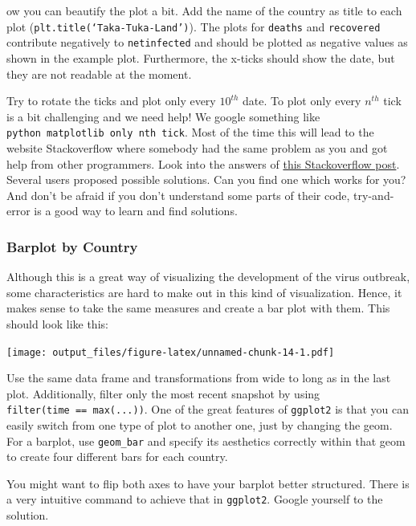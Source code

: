 \documentclass[
  11pt,
]{article}
\newenvironment{tips}[1]
  {
  \begin{itemize}
  \footnotesize
  \renewcommand{\labelitemi}{
    \raisebox{-.7\height}[0pt][0pt]{
      {\setkeys{Gin}{width=3em,keepaspectratio}
        \texttt{[image: images/\#1.png]}}
    }
  }
  \setlength{\fboxsep}{1em}
  \begin{rbox}
  \item
  }
  {
  \end{rbox}
  \end{itemize}
  }
\newenvironment{tipsp}[1]
  {
  \begin{itemize}
  \footnotesize
  \renewcommand{\labelitemi}{
    \raisebox{-.7\height}[0pt][0pt]{
      {\setkeys{Gin}{width=3em,keepaspectratio}
        \texttt{[image: images/\#1.png]}}
    }
  }
  \setlength{\fboxsep}{1em}
  \begin{pbox}
  \item
  }
  {
  \end{pbox}
  \end{itemize}
  }
\begin{document}
\begin{tipsp}
Now you can beautify the plot a bit. Add the name of the country as title to each plot (\texttt{plt.title(‘Taka-Tuka-Land’)}). The plots for \texttt{deaths} and \texttt{recovered} contribute negatively to \texttt{netinfected} and should be plotted as negative values as shown in the example plot. Furthermore, the x-ticks should show the date, but they are not readable at the moment.

Try to rotate the ticks and plot only every \(10^{th}\) date. To plot only every \(n^{th}\) tick is a bit challenging and we need help! We google something like \texttt{python\ matplotlib\ only\ nth\ tick}. Most of the time this will lead to the website Stackoverflow where somebody had the same problem as you and got help from other programmers. Look into the answers of \href{https://stackoverflow.com/questions/12608788/changing-the-tick-frequency-on-x-or-y-axis-in-matplotlib/31997618}{this Stackoverflow post}. Several users proposed possible solutions. Can you find one which works for you? And don't be afraid if you don't understand some parts of their code, try-and-error is a good way to learn and find solutions.

\end{tipsp}

\hypertarget{barplot-by-country}{%
\subsubsection{Barplot by Country}\label{barplot-by-country}}

Although this is a great way of visualizing the development of the virus outbreak, some characteristics are hard to make out in this kind of visualization. Hence, it makes sense to take the same measures and create a bar plot with them. This should look like this:

\texttt{[image: output\_files/figure-latex/unnamed-chunk-14-1.pdf]}

\begin{tips}r

Use the same data frame and transformations from wide to long as in the last plot. Additionally, filter only the most recent snapshot by using \texttt{filter(time\ ==\ max(...))}. One of the great features of \texttt{ggplot2} is that you can easily switch from one type of plot to another one, just by changing the geom. For a barplot, use \texttt{geom\_bar} and specify its aesthetics correctly within that geom to create four different bars for each country.

You might want to flip both axes to have your barplot better structured. There is a very intuitive command to achieve that in \texttt{ggplot2}. Google yourself to the solution.

\end{tips}
\end{document}
